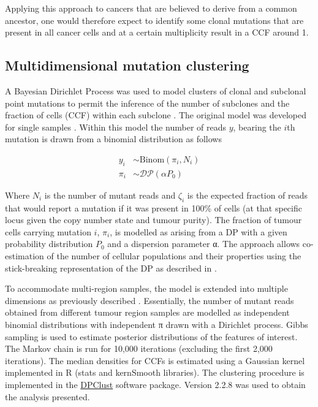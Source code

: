 Applying this approach to cancers that are believed to derive from a common ancestor, one would therefore expect to identify some clonal mutations that are present in all cancer cells and at a certain multiplicity result in a \ac{CCF} around 1. 

\subsection{Multidimensional mutation clustering}

A Bayesian Dirichlet Process was used to model clusters of clonal and subclonal point mutations to permit the inference of the number of subclones and the fraction of cells (\ac{CCF}) within each subclone . The original model was developed for single samples \parencite{Nik-Zainal2012-zz}. Within this model the number of reads $y$, bearing the $i$th mutation is drawn from a binomial distribution as follows

\begin{align}
    y_i &\sim \text{Binom}(\pi_i,N_i)\\
    \pi_i &\sim \mathcal{DP}(\alpha P_0) 
\end{align}

Where $N_i$ is the number of mutant reads and $\zeta_i$ is the expected fraction of reads that would report a mutation if it was present in 100\% of cells (at that specific locus given the copy number state and tumour purity). The fraction of tumour cells carrying mutation $i$, $\pi_i$, is modelled as arising from a \acf{DP} with a given probability distribution $P_0$ and a dispersion parameter α. The approach allows co-estimation of the number of cellular populations and their properties using the stick-breaking representation of the \ac{DP} as described in \textcite{Dentro2017-jb}.

To accommodate multi-region samples, the model is extended into multiple dimensions as previously described \parencite{Yates2015-xk, Bolli2014-ph}. Essentially, the number of mutant reads obtained from different tumour region samples are modelled as independent binomial distributions with independent π drawn with a Dirichlet process. Gibbs sampling is used to estimate posterior distributions of the features of interest. The Markov chain is run for 10,000 iterations (excluding the first 2,000 iterations). The median densities for \acp{CCF} is estimated using a Gaussian kernel implemented in R (stats and kernSmooth libraries). The clustering procedure is implemented in the \href{https://github.com/Wedge-Oxford/dpclust}{DPClust} software package. Version 2.2.8 was used to obtain the analysis presented.

